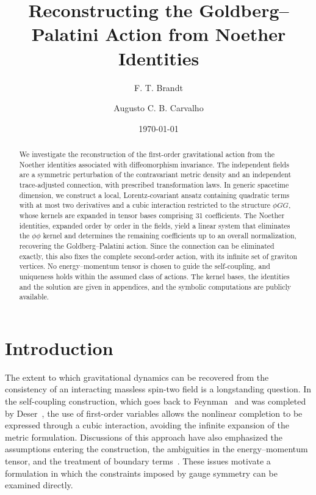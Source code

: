 \documentclass[prd,aps,preprint,superscriptaddress,nofootinbib,amsmath,amssymb,eqsecnum]{revtex4-2}
\begin{document}
\title{Reconstructing the Goldberg--Palatini Action from Noether Identities}

\author{F. T. Brandt}
\author{Augusto C. B. Carvalho}

\date{\today}

\begin{abstract}
We investigate the reconstruction of the first-order gravitational action from the Noether
identities associated with diffeomorphism invariance. The independent fields are a symmetric
perturbation of the contravariant metric density and an independent trace-adjusted
connection, with prescribed transformation laws. In generic spacetime dimension, we construct a local,
Lorentz-covariant ansatz containing quadratic terms with at most two derivatives and a cubic
interaction restricted to the structure $\phi GG$, whose kernels are expanded in tensor bases
comprising 31 coefficients. The Noether identities, expanded order by order in the fields,
yield a linear system that eliminates the $\phi\phi$ kernel and determines the remaining
coefficients up to an overall normalization, recovering the Goldberg--Palatini action. Since
the connection can be eliminated exactly, this also fixes the complete second-order action,
with its infinite set of graviton vertices. No energy--momentum tensor is chosen to guide the
self-coupling, and uniqueness holds within the assumed class of actions. The kernel bases,
the identities and the solution are given in appendices, and the symbolic computations are
publicly available.
\end{abstract}

\maketitle


\section{Introduction}
\label{sec:introduction}

The extent to which gravitational dynamics can be recovered from the consistency of an
interacting massless spin-two field is a longstanding question. In the self-coupling
construction, which goes back to Feynman~\cite{Feynman1995} and was completed by
Deser~\cite{Deser1970}, the use of first-order variables allows the nonlinear completion to
be expressed through a cubic interaction, avoiding the infinite expansion of the metric
formulation. Discussions of this approach have also emphasized the
assumptions entering the construction, the ambiguities in the energy--momentum tensor, and the
treatment of boundary terms~\cite{Padmanabhan2008,Deser2010}. These issues motivate a
formulation in which the constraints imposed by gauge symmetry can be examined directly.
\end{document}
